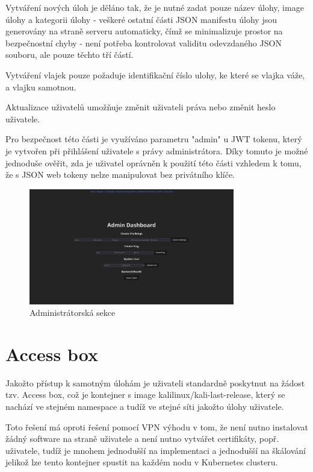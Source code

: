 \documentclass[12pt, a4paper,
oneside,      %
openright
]{report}
\begin{document}
Vytváření nových úloh je děláno tak, že je nutné zadat pouze název úlohy, image úlohy a kategorii úlohy - veškeré ostatní části JSON manifestu úlohy jsou generovány na straně serveru automaticky, čímž se minimalizuje prostor na bezpečnostní chyby - není potřeba kontrolovat validitu odevzdaného JSON souboru, ale pouze těchto tří částí. 

Vytváření vlajek pouze požaduje identifikační číslo ulohy, ke které se vlajka váže, a vlajku samotnou.

Aktualizace uživatelů umožňuje změnit uživateli práva nebo změnit heslo uživatele.

Pro bezpečnost této části je využíváno parametru "admin" u JWT tokenu, který je vytvořen při přihlášení uživatele s právy administrátora. Díky tomuto je možné jednoduše ověřit, zda je uživatel oprávněn k použití této části vzhledem k tomu, že s JSON web tokeny nelze manipulovat bez privátního klíče.

\begin{figure}[h]
	\centering
	\includegraphics[width=0.8\textwidth]{07-admin.png}
	\caption{Administrátorská sekce}
	\label{fig:frontend-admin}
\end{figure}

\section{Access box}
Jakožto přístup k samotným úlohám je uživateli standardně poskytnut na žádost tzv. Access box, což je kontejner s image kalilinux/kali-last-release, který se nachází ve stejném namespace a tudíž ve stejné síti jakožto úlohy uživatele. 

Toto řešení má oproti řešení pomocí VPN výhodu v tom, že není nutno instalovat žádný software na straně uživatele a není nutno vytvářet certifikáty, popř. uživatele, tudíž je mnohem jednodušší na implementaci a jednodušší na škálování jelikož lze tento kontejner spustit na každém nodu v Kubernetes clusteru.
\end{document}
